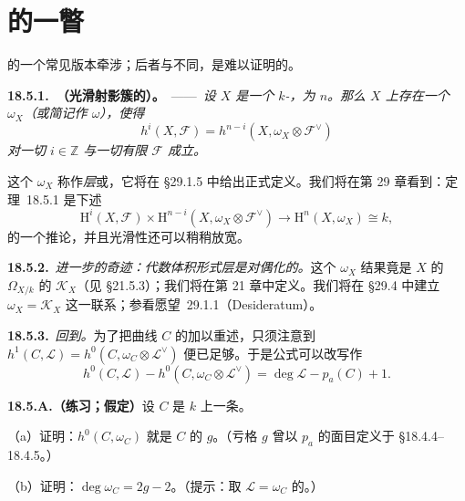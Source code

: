 
\section{\trSerreDuality{}的一瞥}

\trRiemannRoch{}的一个常见版本牵涉\trSerreDuality；后者与\trRiemannRoch{}不同，是难以证明的。

\textbf{18.5.1.\ \trhTheorem（光滑射影簇的\trSerreDuality）。}\ ——\ \emph{设 $X$ 是一个\trGeometricallyIrreducible\trSmooth\trProjective{} $k$-\trVariety，\trDimension{}为 $n$。那么 $X$ 上存在一个\trInvertibleSheaf{} $\omega_X$（或简记作 $\omega$），使得}
\[
h^i(X,\mathscr{F})=h^{n-i}(X,\omega_X\otimes\mathscr{F}^{\vee})
\]
\emph{对一切 $i\in\mathbb{Z}$ 与一切有限\trRank{}\trLocallyFreeSheaf{} $\mathscr{F}$ 成立。}

这个\trInvertibleSheaf{} $\omega_X$ 称作\emph{\trCanonical{}层}或\emph{\trDualizingSheaf}，它将在 \S29.1.5 中给出正式定义。我们将在第 29 章看到：\mbox{定理~18.5.1} 是下述\trPerfectPairing
\begin{equation*}\tag{18.5.1.1}\label{eq:serre-duality-perfect-pairing}
\mathrm{H}^i(X,\mathscr{F})\times\mathrm{H}^{n-i}(X,\omega_X\otimes\mathscr{F}^{\vee})\longrightarrow\mathrm{H}^n(X,\omega_X)\cong k,
\end{equation*}
的一个推论，并且光滑性还可以稍稍放宽。

\textbf{18.5.2.}\ \emph{进一步的奇迹：代数体积形式层是\trSerre{}对偶化的。}\quad 这个\trInvertibleSheaf{} $\omega_X$ 结果竟是 $X$ 的\trCotangentBundle{} $\Omega_{X/k}$ 的\trDeterminant{} $\mathscr{K}_X$（见 \S21.5.3）；我们将在第 21 章中定义\trCotangentBundle。我们将在 \S29.4 中建立 $\omega_X=\mathscr{K}_X$ 这一联系；参看\mbox{愿望~29.1.1}（Desideratum）。

\textbf{18.5.3.}\ \emph{回到\trRiemannRoch。}\quad 为了把曲线 $C$ 的\trRiemannRoch{}加以重述，只须注意到 $h^1(C,\mathscr{L})=h^0(C,\omega_C\otimes\mathscr{L}^{\vee})$ 便已足够。于是\trRiemannRoch{}公式可以改写作
\[
h^0(C,\mathscr{L})-h^0(C,\omega_C\otimes\mathscr{L}^{\vee})=\deg\mathscr{L}-p_a(C)+1.
\]

\textbf{18.5.A.（练习；假定\trSerreDuality）}\quad 设 $C$ 是 $k$ 上一条\trGeometricallyIntegral\trSmooth\trProjective{}\trCurve。

（a）证明：$h^0(C,\omega_C)$ 就是 $C$ 的\trGenus{} $g$。（亏格 $g$ 曾以\trArithmeticGenus{} $p_a$ 的面目定义于 \S18.4.4--18.4.5。）

（b）证明：$\deg\omega_C=2g-2$。（提示：取 $\mathscr{L}=\omega_C$ 的\trRiemannRoch。）


